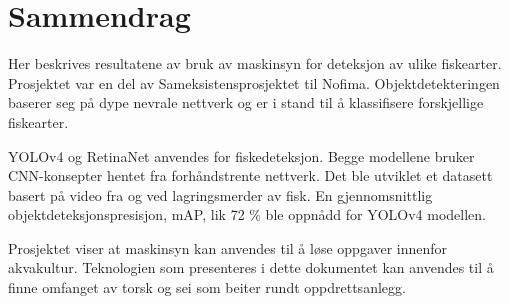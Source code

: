 \section*{Sammendrag}








Her beskrives resultatene av bruk av maskinsyn for deteksjon av ulike fiskearter. Prosjektet var en del av Sameksistensprosjektet til Nofima. Objektdetekteringen baserer seg på dype nevrale nettverk og er i stand til å klassifisere forskjellige fiskearter.

YOLOv4 og RetinaNet anvendes for fiskedeteksjon. Begge modellene bruker CNN-konsepter hentet fra forhåndstrente nettverk. Det ble utviklet et datasett basert på video fra og ved lagringsmerder av fisk. En gjennomsnittlig objektdeteksjonspresisjon, mAP, lik 72 \% ble oppnådd for YOLOv4 modellen.

Prosjektet viser at maskinsyn kan anvendes til å løse oppgaver innenfor akvakultur. Teknologien som presenteres i dette dokumentet kan anvendes til å finne omfanget av torsk og sei som beiter rundt oppdrettsanlegg.%

